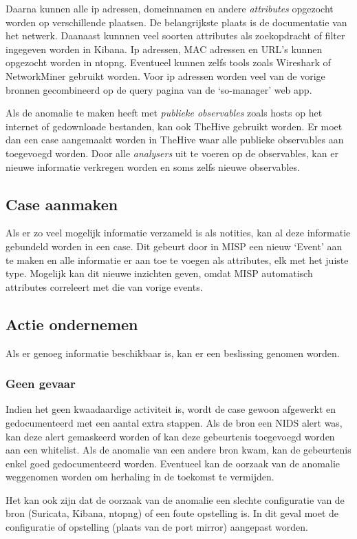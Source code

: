 \documentclass[a4paper,12pt]{report}
\begin{document}
Daarna kunnen alle ip adressen, domeinnamen en andere \emph{attributes} opgezocht worden op verschillende plaatsen.
De belangrijkste plaats is de documentatie van het netwerk.
Daanaast kunnnen veel soorten attributes als zoekopdracht of filter ingegeven worden in Kibana.
Ip adressen, MAC adressen en URL's kunnen opgezocht worden in ntopng.
Eventueel kunnen zelfs tools zoals Wireshark of NetworkMiner gebruikt worden.
Voor ip adressen worden veel van de vorige bronnen gecombineerd op de query pagina van de `so-manager' web app.

Als de anomalie te maken heeft met \emph{publieke observables} zoals hosts op het internet of gedownloade bestanden, kan ook TheHive gebruikt worden.
Er moet dan een case aangemaakt worden in TheHive waar alle publieke observables aan toegevoegd worden.
Door alle \emph{analysers} uit te voeren op de observables, kan er nieuwe informatie verkregen worden en soms zelfs nieuwe observables.

\subsection{Case aanmaken}
Als er zo veel mogelijk informatie verzameld is als notities, kan al deze informatie gebundeld worden in een case.
Dit gebeurt door in MISP een nieuw `Event' aan te maken en alle informatie er aan toe te voegen als attributes, elk met het juiste type.
Mogelijk kan dit nieuwe inzichten geven, omdat MISP automatisch attributes correleert met die van vorige events.

\subsection{Actie ondernemen}
Als er genoeg informatie beschikbaar is, kan er een beslissing genomen worden.

\subsubsection{Geen gevaar}
Indien het geen kwaadaardige activiteit is, wordt de case gewoon afgewerkt en gedocumenteerd met een aantal extra stappen.
Als de bron een NIDS alert was, kan deze alert gemaskeerd worden of kan deze gebeurtenis toegevoegd worden aan een whitelist.
Als de anomalie van een andere bron kwam, kan de gebeurtenis enkel goed gedocumenteerd worden.
Eventueel kan de oorzaak van de anomalie weggenomen worden om herhaling in de toekomst te vermijden.

Het kan ook zijn dat de oorzaak van de anomalie een slechte configuratie van de bron (Suricata, Kibana, ntopng) of een foute opstelling is.
In dit geval moet de configuratie of opstelling (plaats van de port mirror) aangepast worden.
\end{document}
